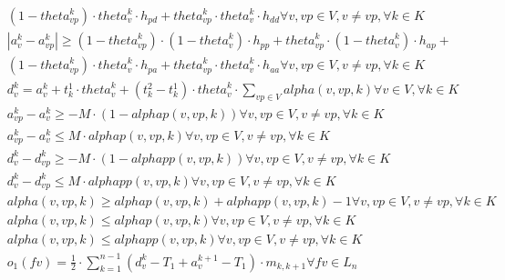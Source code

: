 \begin{align}
  & \left(1 - \mathit{theta}_{vp}^{k}\right) \cdot \mathit{theta}_{v}^{k} \cdot h_{p d} + \mathit{theta}_{vp}^{k} \cdot \mathit{theta}_{v}^{k} \cdot h_{d d} \forall v , vp \in V , v \neq vp , \forall k \in K \tag{eq\_0019\_b} \\
  & \left|a_{v}^{k} - a_{vp}^{k}\right| \geq \left(1 - \mathit{theta}_{vp}^{k}\right) \cdot \left(1 - \mathit{theta}_{v}^{k}\right) \cdot h_{p p} + \mathit{theta}_{vp}^{k} \cdot \left(1 - \mathit{theta}_{v}^{k}\right) \cdot h_{a p} + \tag{eq\_0020\_a} \\
  & \left(1 - \mathit{theta}_{vp}^{k}\right) \cdot \mathit{theta}_{v}^{k} \cdot h_{p a} + \mathit{theta}_{vp}^{k} \cdot \mathit{theta}_{v}^{k} \cdot h_{a a} \forall v , vp \in V , v \neq vp , \forall k \in K \tag{eq\_0020\_b} \\
  &  d_{v}^{k} = a_{v}^{k} + t_{k}^{1} \cdot \mathit{theta}_{v}^{k} + \left(t_{k}^{2} - t_{k}^{1}\right) \cdot \mathit{theta}_{v}^{k} \cdot \sum_{vp \in V} \mathit{alpha} \left(v , vp , k\right) \forall v \in V , \forall k \in K  \tag{eq\_0021} \\
  &  a_{vp}^{k} - a_{v}^{k} \geq - M \cdot \left(1 - alphap \left(v , vp , k\right)\right) \forall v , vp \in V , v \neq vp , \forall k \in K  \tag{eq\_0022} \\
  &  a_{vp}^{k} - a_{v}^{k} \leq M \cdot alphap \left(v , vp , k\right) \forall v , vp \in V , v \neq vp , \forall k \in K  \tag{eq\_0023} \\
  &  d_{v}^{k} - d_{vp}^{k} \geq - M \cdot \left(1 - alphapp \left(v , vp , k\right)\right) \forall v , vp \in V , v \neq vp , \forall k \in K  \tag{eq\_0024} \\
  &  d_{v}^{k} - d_{vp}^{k} \leq M \cdot alphapp \left(v , vp , k\right) \forall v , vp \in V , v \neq vp , \forall k \in K  \tag{eq\_0025} \\
  &  \mathit{alpha} \left(v , vp , k\right) \geq alphap \left(v , vp , k\right) + alphapp \left(v , vp , k\right) - 1 \forall v , vp \in V , v \neq vp , \forall k \in K  \tag{eq\_0026} \\
  &  \mathit{alpha} \left(v , vp , k\right) \leq alphap \left(v , vp , k\right) \forall v , vp \in V , v \neq vp , \forall k \in K  \tag{eq\_0027} \\
  &  \mathit{alpha} \left(v , vp , k\right) \leq alphapp \left(v , vp , k\right) \forall v , vp \in V , v \neq vp , \forall k \in K  \tag{eq\_0028} \\
  &  o_{1} \left(f v\right) = \frac{1}{2} \cdot \sum_{k = 1}^{n - 1} \left(d_{v}^{k} - T_{1} + a_{v}^{k + 1} - T_{1}\right) \cdot m_{k , k + 1} \forall f v \in L_{n}  \tag{eq\_0029} \\

\end{align}
